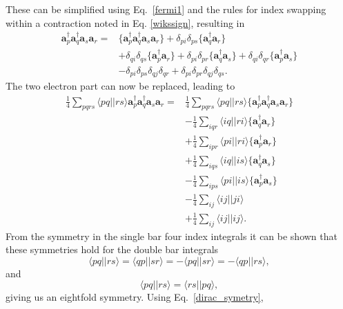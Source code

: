 \documentclass[a4paper,norsk,11pt,twoside]{report}
\begin{document}
These can be simplified using Eq.~\eqref{fermi1} and the rules for
index swapping within a contraction noted in Eq. \eqref{wikssign}, resulting in
\begin{align}
\textbf{a}^{\dag}_p \textbf{a}^{\dag}_q \textbf{a}_s \textbf{a}_r = &\{\textbf{a}^{\dag}_p \textbf{a}^{\dag}_q \textbf{a}_s \textbf{a}_r\} 
+ \delta_{pi} \delta_{ps} \{ \textbf{a}^{\dag}_q \textbf{a}_r \}
\nonumber \\ & 
+ \delta_{qi} \delta_{qs}
\{ \textbf{a}^{\dag}_p \textbf{a}_r \}
+ \delta_{pi} \delta_{pr} 
\{ \textbf{a}^{\dag}_q \textbf{a}_s \}
+ \delta_{qi} \delta_{qr}
\{ \textbf{a}^{\dag}_p \textbf{a}_s \} \nonumber \\ &
- \delta_{pi} \delta_{ps} \delta_{qj} \delta_{qr}
+ \delta_{pi} \delta_{pr} \delta_{qj} \delta_{qs} .
\end{align}
The two electron part can now be replaced, leading to
\begin{align}
\frac{1}{4} \sum_{pqrs} \langle pq||rs \rangle \textbf{a}^{\dag}_p \textbf{a}^{\dag}_q \textbf{a}_s \textbf{a}_r = &
\frac{1}{4}
\sum_{pqrs} \langle pq||rs \rangle \{\textbf{a}^{\dag}_p \textbf{a}^{\dag}_q \textbf{a}_s \textbf{a}_r\}
\nonumber \\ &
- \frac{1}{4} \sum_{iqr} \langle iq||ri \rangle \{\textbf{a}^{\dag}_q \textbf{a}_r \} \nonumber \\ &
+ \frac{1}{4} \sum_{ipr} \langle pi||ri \rangle \{\textbf{a}^{\dag}_p \textbf{a}_r \} \nonumber \\ &
+ \frac{1}{4} \sum_{iqs} \langle iq||is \rangle \{\textbf{a}^{\dag}_q \textbf{a}_s \} \nonumber \\ &
- \frac{1}{4} \sum_{ips} \langle pi||is \rangle \{\textbf{a}^{\dag}_p \textbf{a}_s \} \nonumber \\ &
- \frac{1}{4} \sum_{ij} \langle ij||ji \rangle \nonumber \\ &
+ \frac{1}{4} \sum_{ij} \langle ij||ij \rangle . \nonumber
\end{align}
From the symmetry in the single bar four index integrals it can be shown that these symmetries hold for the double bar integrals
\begin{equation}
\langle pq||rs \rangle =
\langle qp||sr \rangle =
- \langle pq||sr \rangle =
- \langle qp || rs \rangle , \label{dirac_symetry}
\end{equation}
and 
\begin{equation}
\langle pq || rs \rangle = \langle rs || pq \rangle ,
\end{equation}
giving us an eightfold symmetry. Using Eq.~\eqref{dirac_symetry},
\end{document}
